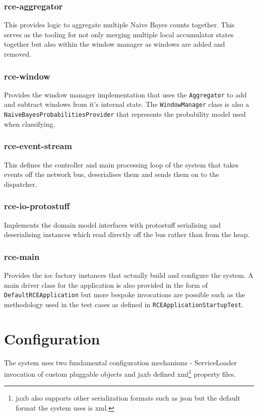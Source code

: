 \documentclass[a4paper,11pt]{scrreprt}
\begin{document}
\subsubsection{rce-aggregator}
This provides logic to aggregate multiple Naive Bayes counts together. This serves as the tooling for not only merging multiple local accumulator states together but also within the window manager as windows are added and removed.

\subsubsection{rce-window}
Provides the window manager implementation that uses the \verb|Aggregator| to add and subtract windows from it's internal state. The \verb|WindowManager| class is also a\\ \verb|NaiveBayesProbabilitiesProvider| that represents the probability model used when classifying.

\subsubsection{rce-event-stream}
This defines the controller and main processing loop of the system that takes events off the network bus, deserialises them and sends them on to the dispatcher.

\subsubsection{rce-io-protostuff}
Implements the domain model interfaces with protostuff serialising and deserialising instances which read directly off the bus rather than from the heap.

\subsubsection{rce-main}
Provides the \acrshort{ioc} factory instances that actually build and configure the system. A main driver class for the application is also provided in the form of \verb|DefaultRCEApplication| but more bespoke invocations are possible such as the methodology used in the test cases as defined in \verb|RCEApplicationStartupTest|.

\section{Configuration}
The system uses two fundamental configuration mechanisms - ServiceLoader invocation of custom pluggable objects and \acrshort{jaxb} defined \acrshort{xml}\footnote{\acrshort{jaxb} also supports other serialization formats such as \acrshort{json} but the default format the system uses is \acrshort{xml}.} property files.
\end{document}
